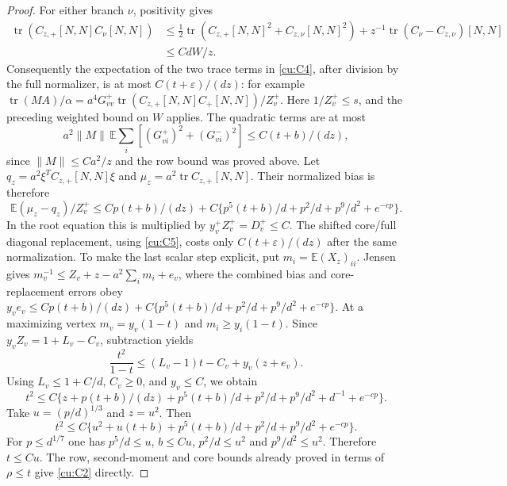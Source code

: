\documentclass[10pt]{article}
\numberwithin{equation}{section}
\newcommand{\1}{\mathbf1}
\begin{document}
\begin{proof}
For either branch $\nu$, positivity gives
\[
 \begin{split}
 \operatorname{tr}(C_{z,+}[N,N]C_\nu[N,N])
 &\le\tfrac12\operatorname{tr}(C_{z,+}[N,N]^2+C_{z,\nu}[N,N]^2)
       +z^{-1}\operatorname{tr}(C_\nu-C_{z,\nu})[N,N]\\
 &\le CdW/z.
 \end{split}
\]
Consequently the expectation of the two trace terms in
\eqref{cu:C4}, after division by the full normalizer, is at most
$C(t+\varepsilon)/(dz)$: for example
$\operatorname{tr}(MA)/\alpha
=a^4G^+_{vv}\operatorname{tr}(C_{z,+}[N,N]C_+[N,N])/Z_v^+$.
Here $1/Z_v^+\le s$, and the preceding weighted bound on $W$ applies.
The quadratic terms are at most
\[
 a^2\|M\|\,\mathbb E\sum_i[(G^+_{vi})^2+(G^-_{vi})^2]
 \le C(t+b)/(dz),
\]
since $\|M\|\le Ca^2/z$ and the row bound was proved above.
Let $q_z=a^2\xi^TC_{z,+}[N,N]\xi$ and
$\mu_z=a^2\operatorname{tr}C_{z,+}[N,N]$.
Their normalized bias is therefore
\[
 \mathbb E(\mu_z-q_z)/Z_v^+
 \le Cp(t+b)/(dz)+C\{p^5(t+b)/d+p^2/d+p^9/d^2+e^{-cp}\}.
 \tag{C6}\label{cu:C6}
\]
In the root equation this is multiplied by $y_v^+Z_v^+=D_v^+\le C$.
The shifted core/full diagonal replacement, using \eqref{cu:C5},
costs only $C(t+\varepsilon)/(dz)$ after the same normalization.
To make the last scalar step explicit, put $m_i=\mathbb E(X_z)_{ii}$.
Jensen gives $m_v^{-1}\le Z_v+z-a^2\sum_i m_i+e_v$, where the
combined bias and core-replacement errors obey
$y_ve_v\le Cp(t+b)/(dz)+C\{p^5(t+b)/d+p^2/d+p^9/d^2+e^{-cp}\}$.
At a maximizing vertex $m_v=y_v(1-t)$ and $m_i\ge y_i(1-t)$.
Since $y_vZ_v=1+L_v-C_v$, subtraction yields
\[
 \frac{t^2}{1-t}\le(L_v-1)t-C_v+y_v(z+e_v).
\]
Using $L_v\le1+C/d$, $C_v\ge0$, and $y_v\le C$, we obtain
\[
 t^2\le C\{z+p(t+b)/(dz)+p^5(t+b)/d+p^2/d+p^9/d^2+d^{-1}+e^{-cp}\}.
\]
Take $u=(p/d)^{1/3}$ and $z=u^2$. Then
\[
 t^2\le C\{u^2+u(t+b)+p^5(t+b)/d+p^2/d+p^9/d^2+e^{-cp}\}.
\]
For $p\le d^{1/7}$ one has $p^5/d\le u$, $b\le Cu$,
$p^2/d\le u^2$ and $p^9/d^2\le u^2$.
Therefore $t\le Cu$. The row, second-moment and core bounds already
proved in terms of $\rho\le t$ give \eqref{cu:C2} directly.
\end{proof}
\end{document}
